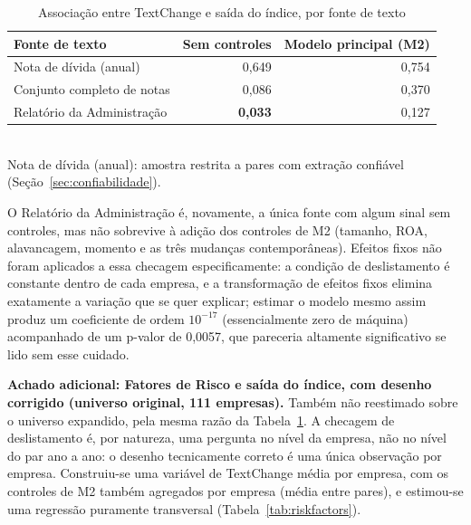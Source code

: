 \documentclass[a4paper,12pt]{report}
\begin{document}
\begin{table}[htbp]
    \centering
    \caption{Associação entre TextChange e saída do índice, por fonte de texto}
    \label{tab:delisting}
    \begin{tabular}{@{}lrr@{}}
        \toprule
        \textbf{Fonte de texto} & \textbf{Sem controles} & \textbf{Modelo principal (M2)} \\
        \midrule
        Nota de dívida (anual)      & 0,649 & 0,754 \\
        Conjunto completo de notas  & 0,086 & 0,370 \\
        Relatório da Administração  & \textbf{0,033} & 0,127 \\
        \bottomrule
    \end{tabular}
    \\[0.3cm]
    {\footnotesize Nota de dívida (anual): amostra restrita a pares com extração confiável (Seção~\ref{sec:confiabilidade}).}
\end{table}

O Relatório da Administração é, novamente, a única fonte com algum sinal sem controles, mas não sobrevive à adição dos controles de M2 (tamanho, ROA, alavancagem, momento e as três mudanças contemporâneas). Efeitos fixos não foram aplicados a essa checagem especificamente: a condição de deslistamento é constante dentro de cada empresa, e a transformação de efeitos fixos elimina exatamente a variação que se quer explicar; estimar o modelo mesmo assim produz um coeficiente de ordem $10^{-17}$ (essencialmente zero de máquina) acompanhado de um p-valor de 0,0057, que pareceria altamente significativo se lido sem esse cuidado.

\textbf{Achado adicional: Fatores de Risco e saída do índice, com desenho corrigido (universo original, 111 empresas).} Também não reestimado sobre o universo expandido, pela mesma razão da Tabela~\ref{tab:delisting}. A checagem de deslistamento é, por natureza, uma pergunta no nível da empresa, não no nível do par ano a ano: o desenho tecnicamente correto é uma única observação por empresa. Construiu-se uma variável de TextChange média por empresa, com os controles de M2 também agregados por empresa (média entre pares), e estimou-se uma regressão puramente transversal (Tabela~\ref{tab:riskfactors}).
\end{document}
